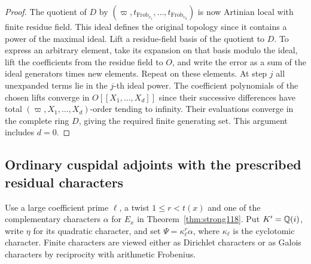 \documentclass[a4paper,11pt]{article}
\theoremstyle{definition}
\theoremstyle{remark}
\newcommand{\Frob}{\operatorname{Frob}}\newcommand{\Gal}{\operatorname{Gal}}
\numberwithin{equation}{section}
\begin{document}
\begin{proof}
The quotient of \(D\) by \((\varpi,t_{\Frob_{v_1}},\ldots,
t_{\Frob_{v_d}})\) is now Artinian local with finite residue field.
This ideal defines the original topology since it contains a power
of the maximal ideal. Lift a residue-field basis of the quotient to
\(D\). To express an arbitrary element, take its expansion on that
basis modulo the ideal, lift the coefficients from the residue field
to \(O\), and write the error as a sum of the ideal generators times
new elements. Repeat on these elements. At step \(j\) all unexpanded
terms lie in the \(j\)-th ideal power. The coefficient polynomials
of the chosen lifts converge in \(O[[X_1,\ldots,X_d]]\) since their
successive differences have total \((\varpi,X_1,\ldots,X_d)\)-order
tending to infinity. Their evaluations converge in the complete ring
\(D\), giving the required finite generating set. This argument
includes \(d=0\).
\end{proof}

\subsection{Ordinary cuspidal adjoints with the prescribed residual characters}\label{nav:IV-30}
Use a large coefficient prime \(\ell\), a twist \(1\le r<t(x)\)
and one of the complementary characters \(\alpha\) for \(E_x\)
in Theorem~\ref{thm:strong118}. Put \(K'=\mathbb Q(i)\), write
\(\eta\) for its quadratic character, and set
\(\Psi=\kappa_\ell^r\alpha\), where \(\kappa_\ell\) is the
cyclotomic character. Finite characters are viewed either as
Dirichlet characters or as Galois characters by reciprocity
with arithmetic Frobenius.
\end{document}
